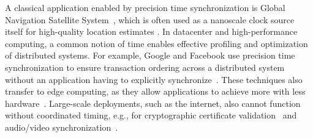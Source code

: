 A classical application enabled by precision time synchronization
is Global Navigation Satellite System~\cite{intro-to-gnss},
which is often used as a nanoscale clock source itself for high-quality location estimates
\cite{gnss-location-and-time-advances,gnss-for-high-precision-timing}.
%
%
In datacenter and high-performance computing,
a common notion of time enables effective profiling and optimization of distributed systems.
For example, Google and Facebook use precision time synchronization to ensure transaction ordering across a distributed system without an application having to explicitly synchronize~\cite{corbett2013spanner,li2020sundial,ouellete2023precision}.
These techniques also transfer to edge computing, as they allow applications to achieve more with less hardware~\cite{chen2021achieving, wang2019frame}.
Large-scale deployments, such as the internet,
also cannot function without coordinated timing,
e.g., for cryptographic certificate validation~\cite{ssl-client-warnings}
and audio/video synchronization~\cite{time-synchronization-for-multimedia}.

